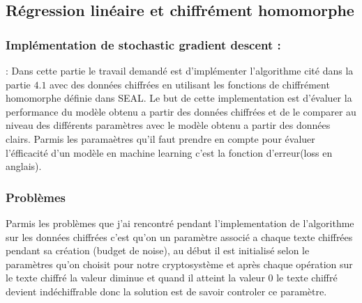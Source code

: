 \documentclass[a4paper,12pt]{article}
\begin{document}
  \subsection{Régression linéaire et chiffrément homomorphe}
  \subsubsection{Implémentation de stochastic gradient descent : \cite{code_HE_lr}}: 
  Dans cette partie le travail demandé est d'implémenter l'algorithme cité dans la partie $4.1$ avec des données chiffrées en utilisant les fonctions de chiffrément homomorphe définie dans SEAL. \newline 
  Le but de cette implementation est d'évaluer la performance du modèle obtenu a partir des données chiffrées et de le comparer au niveau des différents paramètres avec le modèle obtenu a partir des données clairs.\newline
  Parmis les paramaètres qu'il faut prendre en compte pour évaluer l'éfficacité d'un modèle en machine learning c'est la fonction d'erreur(loss en anglais).\newline  
  \subsubsection{Problèmes}
  Parmis les problèmes que j'ai rencontré pendant l'implementation de l'algorithme  sur les données chiffrées c'est qu'on un paramètre associé a chaque texte chiffrées pendant sa création (budget de noise), au début il est initialisé selon le paramètres qu'on choisit pour notre cryptosystème  et après chaque opération sur le texte chiffré la valeur diminue et quand il atteint la valeur 0 le texte chiffré devient indéchiffrable donc la solution est de savoir controler ce paramètre.
\end{document}
